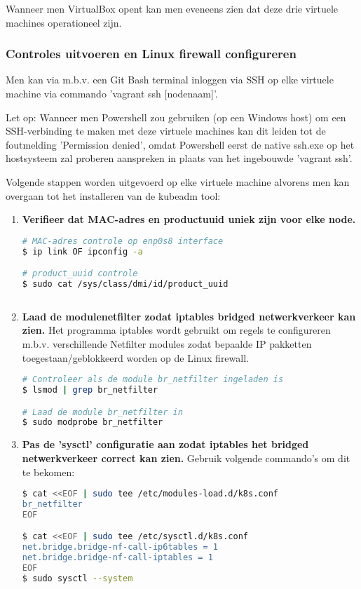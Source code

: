 Wanneer men VirtualBox opent kan men eveneens zien dat deze drie virtuele machines operationeel zijn. 


\subsubsection{Controles uitvoeren en Linux firewall configureren}

Men kan via m.b.v. een Git Bash terminal inloggen via SSH op elke virtuele machine via commando 'vagrant ssh [nodenaam]'.

Let op: Wanneer men Powershell zou gebruiken (op een Windows host) om een SSH-verbinding te maken met deze virtuele machines kan dit leiden tot de foutmelding 'Permission denied', omdat Powershell eerst de native ssh.exe op het hostsysteem zal proberen aanspreken in plaats van het ingebouwde 'vagrant ssh'.

Volgende stappen worden uitgevoerd op elke virtuele machine alvorens men kan overgaan tot het installeren van de kubeadm tool: 
\begin{enumerate}
    \item {\bf Verifieer dat MAC-adres en product\textunderscore uuid uniek zijn voor elke node.}
\begin{lstlisting}[language=bash]
# MAC-adres controle op enp0s8 interface
$ ip link OF ipconfig -a

# product_uuid controle 
$ sudo cat /sys/class/dmi/id/product_uuid  
   
\end{lstlisting} 

    \item {\bf Laad de module\textunderscore netfilter zodat iptables bridged netwerkverkeer kan zien.}
Het programma iptables wordt gebruikt om regels te configureren m.b.v. verschillende Netfilter modules zodat bepaalde IP pakketten toegestaan/geblokkeerd worden op de Linux firewall.
\begin{lstlisting}[language=bash]
# Controleer als de module br_netfilter ingeladen is 
$ lsmod | grep br_netfilter

# Laad de module br_netfilter in
$ sudo modprobe br_netfilter

\end{lstlisting}

    \item {\bf Pas de 'sysctl' configuratie aan zodat iptables het bridged netwerkverkeer correct kan zien.}
Gebruik volgende commando's om dit te bekomen:
\begin{lstlisting}[language=bash]
$ cat <<EOF | sudo tee /etc/modules-load.d/k8s.conf
br_netfilter
EOF

$ cat <<EOF | sudo tee /etc/sysctl.d/k8s.conf
net.bridge.bridge-nf-call-ip6tables = 1
net.bridge.bridge-nf-call-iptables = 1
EOF
$ sudo sysctl --system

\end{lstlisting}
    
\end{enumerate}



